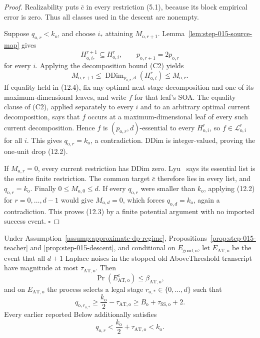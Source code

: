 \begin{proof}
Realizability puts \(\bar c\) in every restriction (5.1), because its
block empirical error is zero. Thus all classes used in the descent are
nonempty.

Suppose \(q_{\mathrm o,r}<k_{\mathrm o}\), and choose \(i_*\) attaining
\(M_{\mathrm o,r+1}\). Lemma~\ref{lem:step-015-source-map} gives
\[
H_{\mathrm o,i_*}^{r+1}\subseteq H_{\mathrm o,i}^{r},
\qquad
p_{\mathrm o,r+1}=2p_{\mathrm o,r}
\]
for every \(i\). Applying the decomposition bound (C2) yields
\[
M_{\mathrm o,r+1}
\le\operatorname{DDim}_{p_{\mathrm o,r},d}
(H_{\mathrm o,i}^r)
\le M_{\mathrm o,r}.
\tag{12.4}
\]
If equality held in (12.4), fix any optimal next-stage decomposition and
one of its maximum-dimensional leaves, and write \(f\) for that leaf's
SOA. The equality clause of (C2), applied separately to every \(i\) and
to an arbitrary optimal current decomposition, says that \(f\) occurs at a
maximum-dimensional leaf of every such current decomposition. Hence \(f\)
is \((p_{\mathrm o,r},d)\)-essential to every
\(H_{\mathrm o,i}^r\), so \(f\in\mathcal L_{\mathrm o,i}^r\) for all
\(i\). This gives \(q_{\mathrm o,r}=k_{\mathrm o}\), a contradiction.
DDim is integer-valued, proving the one-unit drop (12.2).

If \(M_{\mathrm o,r}=0\), every current restriction has DDim zero.
Lyu~\citep[Corollary~4.1, item~4]{lyu2025} says its essential list is
the entire finite restriction. The common target \(\bar c\) therefore lies
in every list, and \(q_{\mathrm o,r}=k_{\mathrm o}\).
Finally \(0\le M_{\mathrm o,0}\le d\). If every
\(q_{\mathrm o,r}\) were smaller than \(k_{\mathrm o}\), applying (12.2)
for \(r=0,\ldots,d-1\) would give \(M_{\mathrm o,d}=0\), which forces
\(q_{\mathrm o,d}=k_{\mathrm o}\), again a contradiction. This proves
(12.3) by a finite potential argument with no imported success event.
\(\square\)


\end{proof}

\begin{lemma}\label{lem:step-015-at}
Under Assumption~\ref{assump:approximate-dp-regime},
Propositions~\ref{prop:step-015-teacher} and
\ref{prop:step-015-descent}, and conditional on
\(E_{\mathrm{good,o}}\), let \(E_{\mathrm{AT,o}}\) be the event that all
\(d+1\) Laplace noises in the stopped old AboveThreshold transcript have
magnitude at most \(\tau_{\mathrm{AT,o}}\). Then
\[
\Pr(E_{\mathrm{AT,o}}^c)\le\beta_{\mathrm{AT,o}},
\tag{13.1}
\]
and on \(E_{\mathrm{AT,o}}\) the process selects a legal stage
\(r_{\mathrm o,*}\in\{0,\ldots,d\}\) such that
\[
q_{\mathrm o,r_{\mathrm o,*}}
\ge\frac{k_{\mathrm o}}2-\tau_{\mathrm{AT,o}}
\ge B_{\mathrm o}+\tau_{\mathrm{SS,o}}+2.
\tag{13.2}
\]
Every earlier reported Below additionally satisfies
\[
q_{\mathrm o,r}<\frac{k_{\mathrm o}}2+\tau_{\mathrm{AT,o}}
<k_{\mathrm o}.
\tag{13.3}
\]


\end{lemma}

